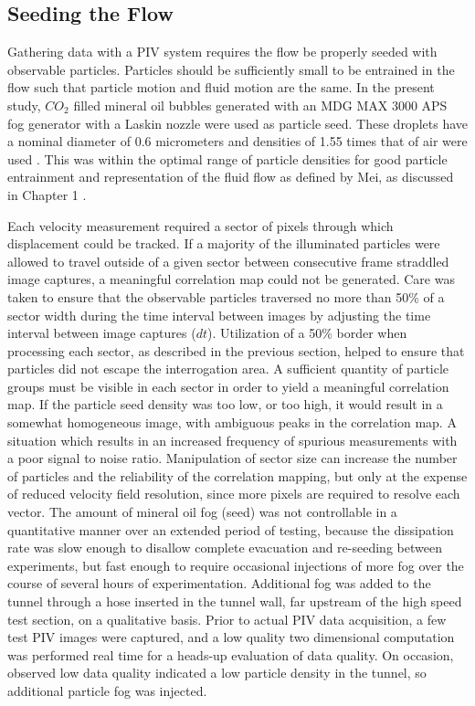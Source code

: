 \subsection{Seeding the Flow}

Gathering data with a PIV system requires the flow be properly seeded with 
observable particles. Particles should be sufficiently small to be entrained in 
the flow such that particle motion and fluid motion are the same. In the 
present study, $CO_2$ filled mineral oil bubbles generated with an MDG MAX 3000 
APS fog generator with a Laskin nozzle were used as particle seed. These 
droplets have a nominal diameter of 0.6 micrometers and densities of 1.55 times 
that of air were used \cite{mdgfog}. This was within the optimal range of 
particle densities for good particle entrainment and representation of the 
fluid flow as defined by Mei, as discussed in Chapter 1 \cite{mei1996}.

Each velocity measurement 
required a sector of pixels through which displacement could be tracked. If 
a majority of the illuminated particles were allowed to travel outside of a 
given sector between consecutive frame straddled image captures, a meaningful 
correlation map could not be generated. Care was taken to ensure that the 
observable particles 
traversed no more than 50\% of a sector width during the time interval between 
images by adjusting the time interval between image captures ($dt$). 
Utilization of a 50\% border when processing each sector, as described in the 
previous section, helped to ensure that particles did not escape the 
interrogation area. A sufficient quantity of particle groups must be visible in 
each sector in order to yield a meaningful correlation map. If the particle 
seed density was too low, or too high, it would result in a somewhat 
homogeneous image, with ambiguous peaks in the correlation map. A situation 
which results in an increased frequency of spurious measurements with a 
poor signal to noise ratio. Manipulation of sector size 
can increase the number of particles and the reliability of the correlation 
mapping, but only at the expense of reduced velocity field resolution, since 
more pixels are required to resolve each vector.  The amount of mineral oil fog 
(seed) was not controllable in a quantitative manner over an extended period of 
testing, because the dissipation rate was slow enough to disallow complete 
evacuation and re-seeding between experiments, but fast enough to require 
occasional injections of more fog over the course of several hours of 
experimentation. Additional fog was added to the tunnel through a hose inserted 
in the tunnel wall, far upstream of the high speed test section, on a 
qualitative basis. Prior to actual PIV data acquisition, a few test PIV images 
were captured, and a low quality two dimensional computation was performed real 
time for a heads-up evaluation of data quality. On occasion, observed low data 
quality indicated a low particle density in the tunnel, 
so additional particle fog was injected.



